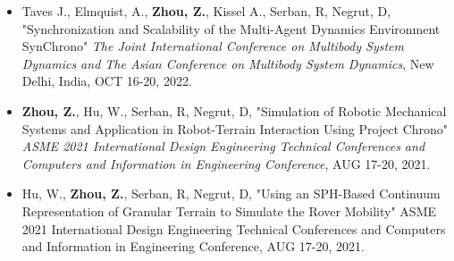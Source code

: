



\begin{footnotesize}

\begin{itemize}[leftmargin=2ex, nosep, noitemsep]
	
	\item {Taves J., Elmquist, A., \textbf{Zhou, Z.}, Kissel A., Serban, R, Negrut, D, "Synchronization and Scalability of the Multi-Agent Dynamics Environment SynChrono" \textit {The Joint International Conference on Multibody System Dynamics and The Asian Conference on Multibody System Dynamics}, New Delhi, India, OCT 16-20, 2022.}
	
	
	
	\item {\textbf{Zhou, Z.}, Hu, W., Serban, R, Negrut, D, "Simulation of Robotic Mechanical Systems and Application in Robot-Terrain Interaction Using Project Chrono" \textit {ASME 2021 International Design Engineering Technical Conferences and Computers and Information in Engineering Conference}, AUG 17-20, 2021.}
	

	
	\item {Hu, W., \textbf{Zhou, Z.}, Serban, R, Negrut, D, "Using an SPH-Based Continuum Representation of Granular Terrain to Simulate the Rover Mobility" {ASME 2021 International Design Engineering Technical Conferences and Computers and Information in Engineering Conference}, AUG 17-20, 2021.}
	

\end{itemize}
	
\end{footnotesize}


